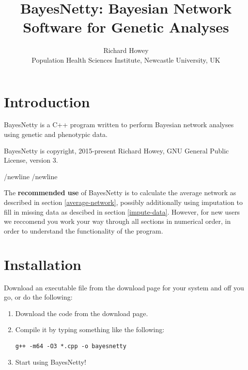 \documentclass[a4paper,12pt]{article}
\begin{document}
\title{BayesNetty: Bayesian Network Software for Genetic Analyses}
\date{}
\author{Richard Howey\\Population Health Sciences Institute, Newcastle University, UK}
\maketitle
\newpage
\tableofcontents
\newpage
\section{Introduction}
\label{introduction}

BayesNetty is a C++ program written to perform Bayesian network analyses using genetic and phenotypic data. 

BayesNetty is copyright, 2015-present Richard Howey, GNU General Public License, version 3. 

/newline /newline

The {\bf recommended use} of BayesNetty is to calculate the average network as described in  section \ref{average-network}, possibly additionally using imputation to fill in missing data as descibed in  section \ref{impute-data}. However, for new users we reccomend you work your way through all sections in numerical order, in order to understand the functionality of the program. 


\section{Installation}
\label{installation}

Download an executable file from the download$\:$page for your system and off you go, or do the following: 
\begin{enumerate}

\item Download the code from the download page. 
\item Compile it by typing something like the following: \vspace{0.35cm} \begin{lstlisting}
g++ -m64 -O3 *.cpp -o bayesnetty 
\end{lstlisting} \vspace{0.35cm}
\item Start using BayesNetty!\end{enumerate}

\end{document}

